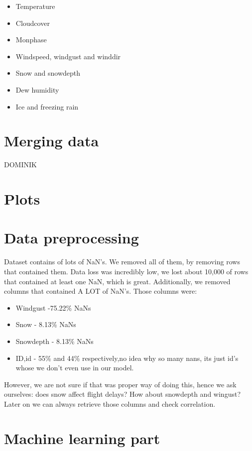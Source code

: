 \documentclass{article}
\begin{document}
			\begin{itemize}
\item Temperature
\item Cloudcover
\item Monphase
\item Windspeed, windgust and winddir
\item Snow and snowdepth
\item Dew humidity
\item Ice and freezing rain
				
			\end{itemize}


\section{Merging data}

DOMINIK

\section{Plots}


\section{Data preprocessing}
Dataset contains of lots of NaN's. We removed all of them, by removing rows that contained them. Data loss
was incredibly low, we lost about 10,000 of rows that contained at least one NaN, which is great. Additionally,
we removed columns that contained A LOT of NaN's. Those columns were:
	\begin{itemize}
		\item Windgust -75.22\% NaNs
		\item Snow - 8.13\% NaNs
		\item Snowdepth - 8.13\% NaNs
		\item ID,id - 55\% and 44\% respectively,no idea why so many nans, its just id's whose we don't even use in our model.
	\end{itemize}


However, we are not sure if that was proper way of doing this, hence we ask ourselves: does snow affect flight delays? How about snowdepth and wingust? Later on we can always retrieve those columns and check correlation.

\section{Machine learning part}
\end{document}
